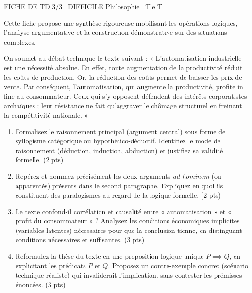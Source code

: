 \documentclass[11pt]{article}
\begin{document}
\begin{tcolorbox}[enhanced,colback=popink,colframe=popink,arc=10pt,boxrule=0pt,left=12pt,right=12pt,top=9pt,bottom=9pt]
{\color{white}\popxbold\small FICHE DE TD 3/3 \textbullet\ DIFFICILE \hfill Philosophie \textbullet\ Tle T\par}
\end{tcolorbox}
\vspace{4pt}
Cette fiche propose une synthèse rigoureuse mobilisant les opérations logiques, l'analyse argumentative et la construction démonstrative sur des situations complexes.

\begin{exercice}
On soumet au débat technique le texte suivant : « L'automatisation industrielle est une nécessité absolue. En effet, toute augmentation de la productivité réduit les coûts de production. Or, la réduction des coûts permet de baisser les prix de vente. Par conséquent, l'automatisation, qui augmente la productivité, profite in fine au consommateur. Ceux qui s'y opposent défendent des intérêts corporatistes archaïques ; leur résistance ne fait qu'aggraver le chômage structurel en freinant la compétitivité nationale. »
\begin{enumerate}
    \item Formalisez le raisonnement principal (argument central) sous forme de syllogisme catégorique ou hypothético-déductif. Identifiez le mode de raisonnement (déduction, induction, abduction) et justifiez sa validité formelle. \hfill (2 pts)
    \item Repérez et nommez précisément les deux arguments \textit{ad hominem} (ou apparentés) présents dans le second paragraphe. Expliquez en quoi ils constituent des paralogismes au regard de la logique formelle. \hfill (2 pts)
    \item Le texte confond-il corrélation et causalité entre « automatisation » et « profit du consommateur » ? Analysez les conditions économiques implicites (variables latentes) nécessaires pour que la conclusion tienne, en distinguant conditions nécessaires et suffisantes. \hfill (3 pts)
    \item Reformulez la thèse du texte en une proposition logique unique $P \implies Q$, en explicitant les prédicats $P$ et $Q$. Proposez un contre-exemple concret (scénario technique réaliste) qui invaliderait l'implication, sans contester les prémisses énoncées. \hfill (3 pts)
\end{enumerate}
\end{exercice}
\end{document}
